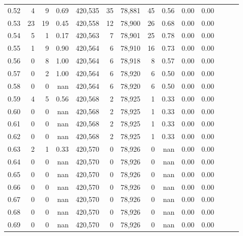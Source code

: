 \begin{tabular}{rrrrrrrrrrrrrr}
0.52 &       4 &      9 &  0.69 &  420,535 &       35 &  78,881 &      45 &  0.56 &  0.00 &      0.00 \\
0.53 &      23 &     19 &  0.45 &  420,558 &       12 &  78,900 &      26 &  0.68 &  0.00 &      0.00 \\
0.54 &       5 &      1 &  0.17 &  420,563 &        7 &  78,901 &      25 &  0.78 &  0.00 &      0.00 \\
0.55 &       1 &      9 &  0.90 &  420,564 &        6 &  78,910 &      16 &  0.73 &  0.00 &      0.00 \\
0.56 &       0 &      8 &  1.00 &  420,564 &        6 &  78,918 &       8 &  0.57 &  0.00 &      0.00 \\
0.57 &       0 &      2 &  1.00 &  420,564 &        6 &  78,920 &       6 &  0.50 &  0.00 &      0.00 \\
0.58 &       0 &      0 &   nan &  420,564 &        6 &  78,920 &       6 &  0.50 &  0.00 &      0.00 \\
0.59 &       4 &      5 &  0.56 &  420,568 &        2 &  78,925 &       1 &  0.33 &  0.00 &      0.00 \\
0.60 &       0 &      0 &   nan &  420,568 &        2 &  78,925 &       1 &  0.33 &  0.00 &      0.00 \\
0.61 &       0 &      0 &   nan &  420,568 &        2 &  78,925 &       1 &  0.33 &  0.00 &      0.00 \\
0.62 &       0 &      0 &   nan &  420,568 &        2 &  78,925 &       1 &  0.33 &  0.00 &      0.00 \\
0.63 &       2 &      1 &  0.33 &  420,570 &        0 &  78,926 &       0 &   nan &  0.00 &      0.00 \\
0.64 &       0 &      0 &   nan &  420,570 &        0 &  78,926 &       0 &   nan &  0.00 &      0.00 \\
0.65 &       0 &      0 &   nan &  420,570 &        0 &  78,926 &       0 &   nan &  0.00 &      0.00 \\
0.66 &       0 &      0 &   nan &  420,570 &        0 &  78,926 &       0 &   nan &  0.00 &      0.00 \\
0.67 &       0 &      0 &   nan &  420,570 &        0 &  78,926 &       0 &   nan &  0.00 &      0.00 \\
0.68 &       0 &      0 &   nan &  420,570 &        0 &  78,926 &       0 &   nan &  0.00 &      0.00 \\
0.69 &       0 &      0 &   nan &  420,570 &        0 &  78,926 &       0 &   nan &  0.00 &      0.00 \\

\end{tabular}
